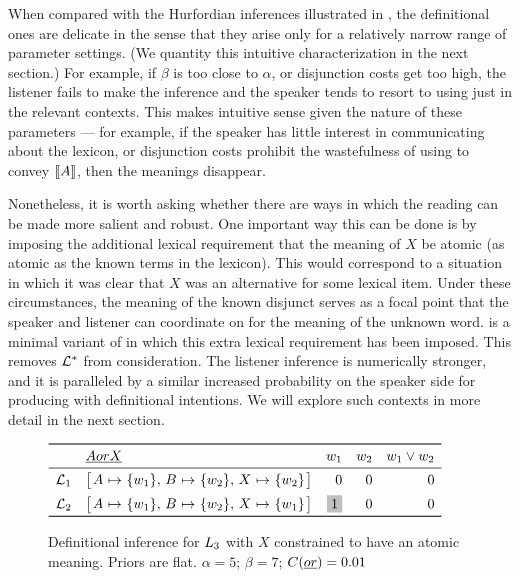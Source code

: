 \documentclass{article}
\begin{document}
When compared with the Hurfordian inferences illustrated in
, the definitional ones are delicate
in the sense that they arise only for a relatively narrow range of
parameter settings. (We quantity this intuitive characterization in
the next section.) For example, if $\beta$ is too close to $\alpha$,
or disjunction costs get too high, the listener fails to make the
inference and the speaker tends to resort to using just  in
the relevant contexts. This makes intuitive sense given the nature of
these parameters --- for example, if the speaker has little interest
in communicating about the lexicon, or disjunction costs prohibit the
wastefulness of using  to convey $\sem{A}$, then the
meanings disappear. 

Nonetheless, it is worth asking whether there are ways in which the
reading can be made more salient and robust. One important way this
can be done is by imposing the additional lexical requirement that the
meaning of $X$ be atomic (as atomic as the known terms in the
lexicon). This would correspond to a situation in which it was clear
that $X$ was an alternative for some lexical item. Under these
circumstances, the meaning of the known disjunct serves as a focal
point \citep{Schelling60} that the speaker and listener can coordinate
on for the meaning of the unknown word.  is a
minimal variant of  in which this extra lexical
requirement has been imposed. This removes $\LexStar$ from
consideration. The listener inference is numerically stronger, and it
is paralleled by a similar increased probability on the speaker side
for producing  with definitional intentions. We will
explore such contexts in more detail in the next section.

\begin{figure}[tp]
  \centering
  $\begin{array}[c]{l l r r r}
    \toprule
      & \word{A or X}  & w_{1} & w_{2} & w_{1} \vee w_{2} \\
    \midrule
    \Lex_{1} & \smallhurfordlex{w_{1}}{w_{2}}{w_{2}}        & 0 & 0 & 0 \\[1ex]
    \Lex_{2} & \smallhurfordlex{w_{1}}{w_{2}}{w_{1}}        & \graycell{1} & 0 & 0\\
    \bottomrule
  \end{array}$
  \caption{Definitional inference for $\ListenerK[3]$ with $X$ constrained to have an atomic meaning. 
    Priors are flat. 
    $\alpha = 5$; 
    $\beta = 7$; 
    $\Costs(\word{or}) = 0.01$}
  \label{fig:def-focal}
\end{figure}
\end{document}
